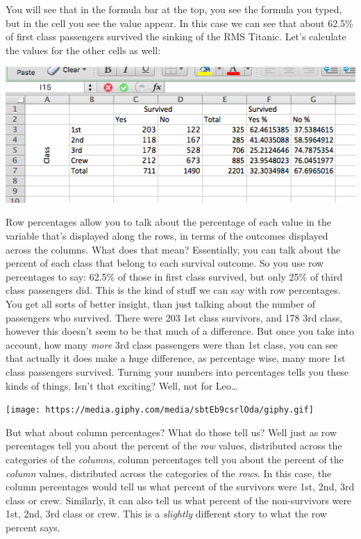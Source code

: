 \documentclass[
]{book}
\begin{document}
You will see that in the formula bar at the top, you see the formula you typed, but in the cell you see the value appear. In this case we can see that about 62.5\% of first class passengers survived the sinking of the RMS Titanic. Let's calculate the values for the other cells as well:

\includegraphics{imgs/all_row_perc.png}

Row percentages allow you to talk about the percentage of each value in the variable that's displayed along the rows, in terms of the outcomes displayed across the columns. What does that mean? Essentially, you can talk about the percent of each class that belong to each survival outcome. So you use row percentages to say: 62.5\% of those in first class survived, but only 25\% of third class passengers did. This is the kind of stuff we can say with row percentages. You get all sorts of better insight, than just talking about the number of passengers who survived. There were 203 1st class survivors, and 178 3rd class, however this doesn't seem to be that much of a difference. But once you take into account, how many \emph{more} 3rd class passengers were than 1st class, you can see that actually it does make a huge difference, as percentage wise, many more 1st class passengers survived. Turning your numbers into percentages tells you these kinds of things. Isn't that exciting? Well, not for Leo\ldots{}

\texttt{[image: https://media.giphy.com/media/sbtEb9csrlOda/giphy.gif]}

But what about column percentages? What do those tell us? Well just as row percentages tell you about the percent of the \emph{row} values, distributed across the categories of the \emph{columns}, column percentages tell you about the percent of the \emph{column} values, distributed across the categories of the \emph{rows}. In this case, the column percentages would tell us what percent of the survivors were 1st, 2nd, 3rd class or crew. Similarly, it can also tell us what percent of the non-survivors were 1st, 2nd, 3rd class or crew. This is a \emph{slightly} different story to what the row percent says.
\end{document}
